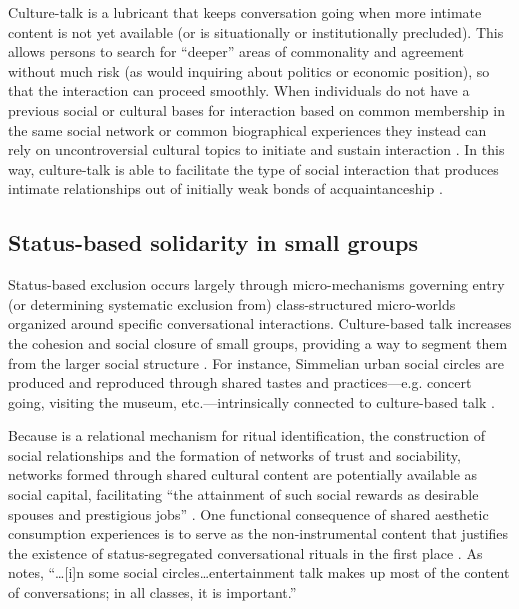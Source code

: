 \documentclass[11pt]{article}
\begin{document}
Culture-talk is a lubricant that keeps conversation going when more intimate content is not yet available (or is situationally or institutionally precluded).  This allows persons to search for ``deeper'' areas of commonality and agreement without much risk (as would inquiring about politics or economic position), so that the interaction can proceed smoothly.   When individuals do not have a previous social or cultural bases for interaction based on common membership in the same social network or common biographical experiences they instead can rely on uncontroversial cultural topics to initiate and sustain interaction \citep[460]{fine77}. In this way, culture-talk is able to facilitate the type of social interaction that produces intimate relationships out of initially weak bonds of acquaintanceship \citep[441]{dimaggio87}.  

\subsection{Status-based solidarity in small groups}
Status-based exclusion occurs largely through micro-mechanisms governing entry (or determining systematic exclusion from) class-structured micro-worlds organized around specific conversational interactions.  Culture-based talk increases the cohesion and social closure of small groups, providing a way to segment them from the larger social structure \citep{fine77}.  For instance,  Simmelian urban social circles are produced and reproduced through shared tastes and practices---e.g. concert going, visiting the museum, etc.---intrinsically connected to culture-based talk \citep[797]{kadushin66}. 

Because is a relational mechanism for ritual identification, the construction of social relationships and the formation of networks of trust and sociability, networks formed through shared cultural content are potentially available as social capital, facilitating ``the attainment of such social rewards as desirable spouses and prestigious jobs'' \citep[443]{dimaggio87}.  One functional consequence of shared aesthetic consumption experiences is to serve as the non-instrumental content that justifies the existence of status-segregated conversational rituals in the first place \citep{ostrower98}. As \citet[125]{collins75} notes, ``\ldots [i]n some social circles{\ldots}entertainment talk makes up most of the content of conversations; in all classes, it is important.'' 
\end{document}
